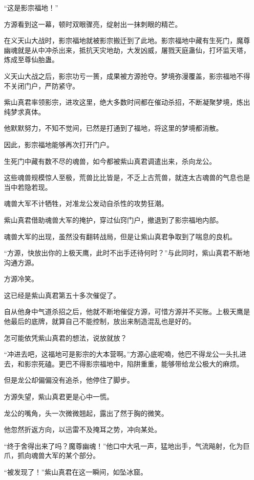 \begin{this_body}
“这是影宗福地！”

方源看到这一幕，顿时双眼骤亮，绽射出一抹刺眼的精芒。

在义天山大战时，影宗福地就被影宗搬迁到了此地。影宗福地中藏有生死门，魔尊幽魂就是从中冲杀出来，抵抗天灾地劫，大发凶威，屠戮天庭蛊仙，打坏监天塔，炼成至尊仙胎蛊。

义天山大战之后，影宗功亏一篑，成果被方源抢夺。梦境弥漫覆盖，影宗福地不得不关闭门户，严防紧守。

紫山真君率领影宗，进攻这里，绝大多数时间都在催动杀招，不断凝聚梦境，炼出纯梦求真体。

他默默努力，不知不觉间，已然是打通到了福地，将这里的梦境都消散。

因此，影宗福地能够再次打开门户。

生死门中藏有数不尽的魂兽，如今都被紫山真君调遣出来，杀向龙公。

这些魂兽规模惊人至极，荒兽比比皆是，不乏上古荒兽，就连太古魂兽的气息也是当中若隐若现。

魂兽大军不计牺牲，对准龙公发动自杀性的攻势狂潮。

紫山真君借助魂兽大军的掩护，穿过仙窍门户，撤退到了影宗福地内部。

魂兽大军的出现，虽然没有翻转战局，但是让紫山真君争取到了喘息的良机。

“方源，快放出你的上极天鹰，此时不出手还待何时？”与此同时，紫山真君不断地沟通方源。

方源冷笑。

这已经是紫山真君第五十多次催促了。

自从他身中气道杀招之后，他就不断地催促方源，可惜方源并不买账。上极天鹰是他最后的底牌，就算自己不能控制，放出来制造混乱也是好的。

怎可能依凭紫山真君的想法，说放就放？

“冲进去吧，这福地可是影宗的大本营啊。”方源心底呢喃，他巴不得龙公一头扎进去，和影宗死磕。更巴不得影宗福地中，陷阱重重，能够带给龙公极大的麻烦。

但是龙公却偏偏没有追杀，他停住了脚步。

方源失望，紫山真君更是心中一慌。

龙公的嘴角，头一次微微翘起，露出了然于胸的微笑。

他忽然折返方向，以迅雷不及掩耳之势，冲向某处。

“终于舍得出来了吗？魔尊幽魂！”他口中大吼一声，猛地出手，气流飚射，化为巨爪，抓向魂兽大军的某个部分。

“被发现了！”紫山真君在这一瞬间，如坠冰窟。


\end{this_body}
